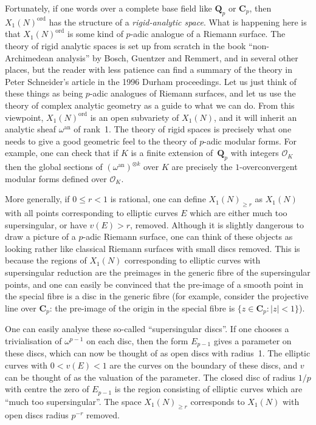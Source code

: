 \documentclass{article}
\newcommand{\C}{\mathbf C}
\newcommand{\Cp}{\C_p}
\renewcommand{\O}{\mathcal O}
\newcommand{\OK}{\O_K}
\newcommand{\Q}{\mathbf{Q}}
\newcommand{\Qp}{\Q_p}
\begin{document}
Fortunately, if one words over a complete base field like $\Q_p$ or $\C_p$,
then $X_1(N)^{\mbox{ord}}$ has the structure of a \emph{rigid-analytic
space}. What is happening here is that $X_1(N)^{\mathrm{ord}}$ is
some kind of $p$-adic analogue of a Riemann surface. The theory of
rigid analytic spaces is set up from scratch in the book ``non-Archimedean
analysis'' by Bosch, Guentzer and Remmert, and in several other places,
but the reader with less
patience can find a summary of the theory in Peter Schneider's article
in the 1996 Durham proceedings. Let us just think of these things
as being $p$-adic analogues of Riemann surfaces, and let us use the
theory of complex analytic geometry as a guide to what we can do. From
this viewpoint, $X_1(N)^{\mathrm{ord}}$ is an open subvariety of $X_1(N)$,
and it will inherit an analytic sheaf $\omega^{\mathrm{an}}$ of rank~1.
The theory of rigid spaces is precisely what
one needs to give a good geometric feel to the theory of $p$-adic
modular forms. For example, one can check that if $K$ is a finite
extension of~$\Qp$ with integers $\OK$ then the global sections
of $(\omega^{\mathrm{an}})^{\otimes k}$ over $K$
are precisely the $1$-overconvergent modular forms defined over $\OK$.

More generally, if $0\leq r<1$ is rational, one can define $X_1(N)_{\geq r}$
as $X_1(N)$ with all points corresponding to elliptic curves $E$ which
are either much too supersingular, or have $v(E)>r$, removed. Although
it is slightly dangerous to draw a picture of a $p$-adic Riemann
surface, one can think of these objects as looking rather like classical
Riemann surfaces with small discs removed. This is because the regions
of $X_1(N)$ corresponding to elliptic curves with supersingular reduction
are the preimages in the generic fibre of the supersingular points,
and one can easily be convinced that the pre-image of a smooth point in the
special fibre is a disc in the generic fibre (for example, consider the
projective line over $\C_p$: the pre-image of the origin in the special
fibre is $\{z\in\Cp:|z|<1\}$). 

One can easily analyse these so-called ``supersingular discs''. 
If one chooses a trivialisation of $\omega^{p-1}$ on each disc,
then the form $E_{p-1}$ gives a parameter on these discs, which can now
be thought of as open discs with radius~1. The
elliptic curves with $0<v(E)<1$ are the curves on the boundary of
these discs, and $v$ can be thought of as the valuation of the parameter.
The closed disc of radius $1/p$ with centre the zero of $E_{p-1}$
is the region consisting of elliptic curves which are ``much too
supersingular''. The space $X_1(N)_{\geq r}$ corresponds to $X_1(N)$
with open discs radius $p^{-r}$ removed.
\end{document}
